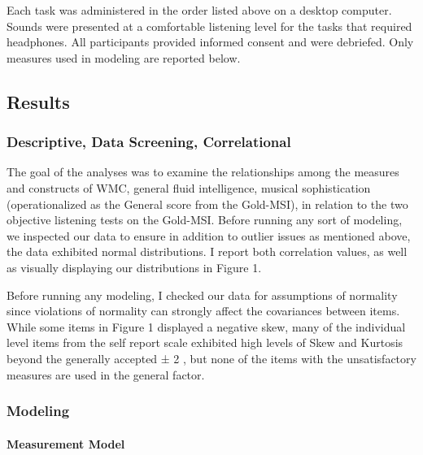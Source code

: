 \documentclass[]{book}
\let\oldparagraph\paragraph
\renewcommand{\paragraph}[1]{\oldparagraph{#1}\mbox{}}
\begin{document}
Each task was administered in the order listed above on a desktop computer.
Sounds were presented at a comfortable listening level for the tasks that required headphones.
All participants provided informed consent and were debriefed.
Only measures used in modeling are reported below.

\hypertarget{results}{%
\subsection{Results}\label{results}}

\hypertarget{descriptive-data-screening-correlational}{%
\subsubsection{Descriptive, Data Screening, Correlational}\label{descriptive-data-screening-correlational}}

The goal of the analyses was to examine the relationships among the measures and constructs of WMC, general fluid intelligence, musical sophistication (operationalized as the General score from the Gold-MSI), in relation to the two objective listening tests on the Gold-MSI.
Before running any sort of modeling, we inspected our data to ensure in addition to outlier issues as mentioned above, the data exhibited normal distributions.
I report both correlation values, as well as visually displaying our distributions in Figure 1.

Before running any modeling, I checked our data for assumptions of normality since violations of normality can strongly affect the covariances between items.
While some items in Figure 1 displayed a negative skew, many of the individual level items from the self report scale exhibited high
levels of Skew and Kurtosis beyond the generally accepted ± 2 \citep{fieldDiscoveringStatisticsUsing2012}, but none of the items with the unsatisfactory measures are used in the general factor.

\hypertarget{modeling}{%
\subsubsection{Modeling}\label{modeling}}

\hypertarget{measurement-model}{%
\paragraph{Measurement Model}\label{measurement-model}}
\end{document}
